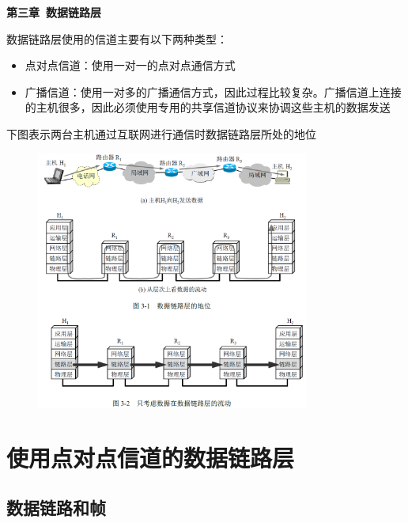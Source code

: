 \documentclass[cs4size,a4paper,10pt]{ctexart}
\begin{document}
	\begin{center}
		{\huge\textbf{第三章\ 数据链路层}}
	\end{center}
	\tableofcontents
	\clearpage

	\setcounter{page}{1}
	\setlength{\parskip}{0.65em}

	数据链路层使用的信道主要有以下两种类型：
	\begin{itemize}
		\item 点对点信道：使用一对一的点对点通信方式
		\item 广播信道：使用一对多的广播通信方式，因此过程比较复杂。广播信道上连接的主机很多，因此必须使用专用的共享信道协议来协调这些主机的数据发送
	\end{itemize}
	
	下图表示两台主机通过互联网进行通信时数据链路层所处的地位
	\begin{figure}[H]
		\centering
		\includegraphics[width=0.8\textwidth]{img/3.1}
	\end{figure}
	

	\section{使用点对点信道的数据链路层}

	\subsection{数据链路和帧}
\end{document}
